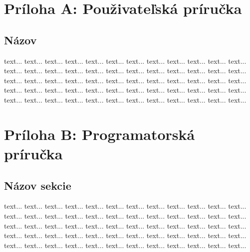 
\section*{\textbf{Príloha A}: Použivateľská príručka}


\subsection{Názov }

 text...  text...  text...  text...  text...  text...  text...  text...  text...  text...  text...  text...  text...  text...  text...  text...  text...  text...  text...  text...  text...  text...  text...  text...  text...  text...  text...  text...  text...  text...  text...  text...  text...  text...  text...  text...  text...  text...  text...  text...  text...  text...  text...  text...  text...  text...  text...  text...  text...  text...  text...  text...  text...  text...  text...  text...  text...  text...  text...  text...

\clearpage

\section*{\textbf{Príloha B}: Programatorská príručka}

\subsection{Názov sekcie}

 text...  text...  text...  text...  text...  text...  text...  text...  text...  text...  text...  text...  text...  text...  text...  text...  text...  text...  text...  text...  text...  text...  text...  text...  text...  text...  text...  text...  text...  text...  text...  text...  text...  text...  text...  text...  text...  text...  text...  text...  text...  text...  text...  text...  text...  text...  text...  text...  text...  text...  text...  text...  text...  text...  text...  text...  text...  text...  text...  text...

